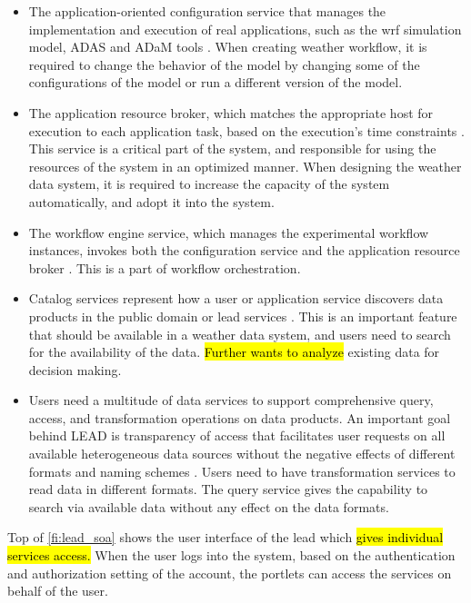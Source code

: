\begin{itemize}
\item The application-oriented configuration service that manages the implementation and execution of real applications, such as the \acrshort{wrf} simulation model, ADAS and ADaM tools \cite{Droegemeier2005Service-OrientedWeather}. When creating weather workflow, it is required to change the behavior of the model by changing some of the configurations of the model or run a different version of the model.
\item The application resource broker, which matches the appropriate host for execution to each application task, based on the execution’s time constraints \cite{Droegemeier2005Service-OrientedWeather}. This service is a critical part of the system, and responsible for using the resources of the system in an optimized manner. When designing the weather data system, it is required to increase the capacity of the system automatically, and adopt it into the system.
\item The workflow engine service, which manages the experimental workflow instances, invokes both the configuration service and the application resource broker \cite{Droegemeier2005Service-OrientedWeather}. This is a part of workflow orchestration.
\item Catalog services represent how a user or application service discovers data products in the public domain or \acrshort{lead} services \cite{Droegemeier2005Service-OrientedWeather}. This is an important feature that should be available in a weather data system, and users need to search for the availability of the data. \hl{Further wants to analyze} existing data for decision making.
\item Users need a multitude of data services to support comprehensive query, access, and transformation operations on data products. An important goal behind LEAD is transparency of access that facilitates user requests on all available heterogeneous data sources without the negative effects of different formats and naming schemes \cite{Droegemeier2005Service-OrientedWeather}. Users need to have transformation services to read data in different formats. The query service gives the capability to search via available data without any effect on the data formats.
\end{itemize}

Top of \cref{fi:lead_soa} shows the user interface of the \acrshort{lead} which \hl{gives individual services access.} When the user logs into the system, based on the authentication and authorization setting of the account, the portlets can access the services on behalf of the user. %

